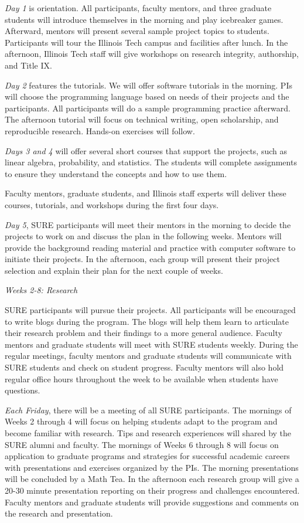 \documentclass[11pt]{NSFamsart}
\begin{document}
\emph{Day 1} is orientation. All participants, faculty mentors, and three graduate students will introduce themselves in the morning and play icebreaker games. Afterward, mentors will present several sample project topics to students.
Participants will tour the Illinois Tech campus and facilities after lunch. In the afternoon, Illinois Tech staff will give workshops on research integrity, authorship, and Title IX.

\emph{Day 2} features the tutorials.
 We will offer software tutorials in the morning. PIs will choose the programming language based on needs of their projects and the participants. All participants will do a sample programming practice afterward. The afternoon tutorial will focus on technical writing, open scholarship, and reproducible research. Hands-on exercises will follow.
 
 \emph{Days 3 and 4} will offer several short courses that support the projects, such as linear algebra, probability, and statistics. The students will complete assignments to ensure they understand the concepts and how to use them.

 
Faculty mentors, graduate students, and Illinois staff experts will deliver these courses, tutorials, and workshops during the first four days.

\emph{Day 5}, SURE participants will meet their mentors in the morning to decide the projects to work on and discuss the plan in the following weeks. Mentors will provide the background
reading material and practice with computer software to initiate their projects. In the afternoon, each group will present their project selection and explain their plan for the next couple of weeks.


\centerline{\emph{Weeks 2-8: Research}}

SURE participants will pursue their projects. All participants will be encouraged to write blogs \cite{Hig21a} during the program. The blogs will help them learn to articulate their research problem and their findings to a more general audience. Faculty mentors and graduate
students will meet with SURE students weekly. During the regular meetings, faculty mentors and graduate students will communicate with SURE students and check on student progress. Faculty mentors will also hold regular office hours throughout the week to be available when students have questions.

\emph{Each Friday}, there will be a meeting of all SURE participants. The mornings of Weeks 2 through 4 will focus on helping students adapt to the program and become familiar with research. Tips and research experiences will shared by the SURE alumni and faculty. The mornings of Weeks 6 through 8 will focus on application to graduate programs and strategies for successful academic careers with presentations and exercises organized by the PIs. The morning presentations will  be concluded by a Math Tea.  In the afternoon each research group will give a 20-30 minute presentation reporting on their progress and challenges encountered. Faculty mentors and graduate students will provide suggestions and comments on the research and presentation.
\end{document}
